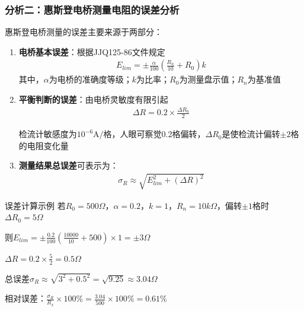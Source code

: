 \documentclass{beamer}
\begin{document}
	\begin{frame}
		\frametitle{分析二：惠斯登电桥测量电阻的误差分析}
		
		\tiny %
		\setlength{\itemsep}{0pt} %
		\setlength{\abovedisplayskip}{2pt} %
		\setlength{\belowdisplayskip}{2pt} %
		
		惠斯登电桥测量的误差主要来源于两部分：
		
		\begin{enumerate}
			\item \textbf{电桥基本误差}：根据JJQ125-86文件规定
			\begin{align}
				E_{lim} = \pm\frac{\alpha}{100}\left(\frac{R_n}{10} + R_0\right)k
			\end{align}
			其中，$\alpha$为电桥的准确度等级；$k$为比率；$R_0$为测量盘示值；$R_n$为基准值
			
			\item \textbf{平衡判断的误差}：由电桥灵敏度有限引起
			\begin{align}
				\Delta R = 0.2 \times \frac{\Delta R_0}{2}
			\end{align}
			
			检流计敏感度为$10^{-6}\mathrm{A/}$格，人眼可察觉$0.2$格偏转，$\Delta R_0$是使检流计偏转$\pm2$格的电阻变化量
		
			\item \textbf{测量结果总误差}可表示为：
			\begin{align}
				\sigma_R \approx \sqrt{E_{lim}^2+(\Delta R)^2}
			\end{align}
		\end{enumerate}
		
		\begin{alertblock}{误差计算示例}
			\scriptsize %
			若$R_0 = 500\Omega$，$\alpha = 0.2$，$k = 1$，$R_n = 10k\Omega$，偏转$\pm1$格时$\Delta R_0 = 5\Omega$
			
			则$E_{lim} = \pm\frac{0.2}{100}(\frac{10000}{10} + 500) \times 1 = \pm3\Omega$
			
			$\Delta R = 0.2 \times \frac{5}{2} = 0.5\Omega$
			
			总误差$\sigma_R \approx \sqrt{3^2+0.5^2} = \sqrt{9.25} \approx 3.04\Omega$
			
			相对误差：$\frac{\sigma_R}{R_x} \times 100\% = \frac{3.04}{500} \times 100\% = 0.61\%$
		\end{alertblock}
	\end{frame}
	
\end{document}
